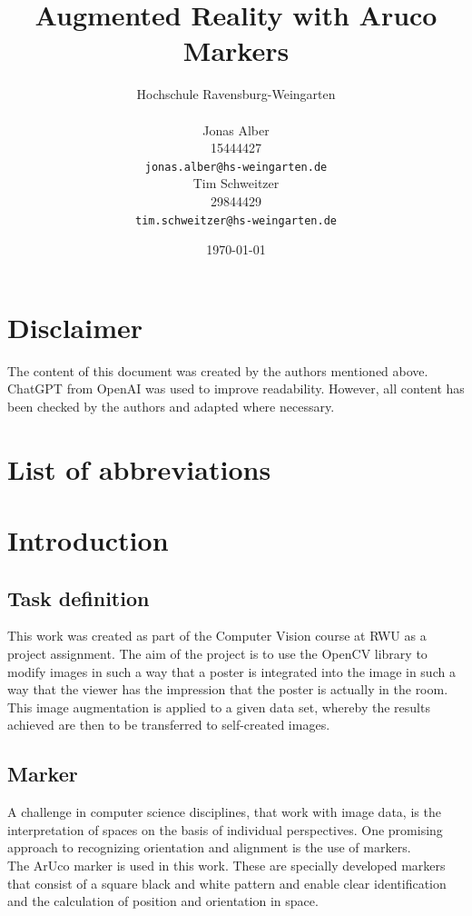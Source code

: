 \documentclass[a4paper,twocolumn]{article}
\title{Augmented Reality with Aruco Markers}
\author{
    Hochschule Ravensburg-Weingarten \\[1em] %
    \begin{minipage}[t]{0.45\textwidth} %
        \centering
        Jonas Alber \\ %
        15444427\\
        \texttt{jonas.alber@hs-weingarten.de} %
    \end{minipage}
    \hfill
    \begin{minipage}[t]{0.45\textwidth} %
        \centering
        Tim Schweitzer \\  29844429 \\ %
        \texttt{tim.schweitzer@hs-weingarten.de} %
    \end{minipage}
}
\date{\today}
\begin{document}
\maketitle

\section*{Disclaimer}
The content of this document was created by the authors mentioned above. ChatGPT from OpenAI was used to improve readability. However, all content has been checked by the authors and adapted where necessary.

\section*{List of abbreviations}
\begin{acronym}[RWU]
\end{acronym}

\section{Introduction}

\subsection{Task definition}
This work was created as part of the Computer Vision course at \ac{RWU} as a project assignment. The aim of the project is to use the OpenCV library to modify images in such a way that a poster is integrated into the image in such a way that the viewer has the impression that the poster is actually in the room.
\\
This image augmentation is applied to a given data set, whereby the results achieved are then to be transferred to self-created images.

\subsection{Marker}
A challenge in computer science disciplines, that work with image data, is the interpretation of spaces on the basis of individual perspectives. One promising approach to recognizing orientation and alignment is the use of markers.
\\
The ArUco marker is used in this work. These are specially developed markers that consist of a square black and white pattern and enable clear identification and the calculation of position and orientation in space. \cite{aruco1}
\end{document}
